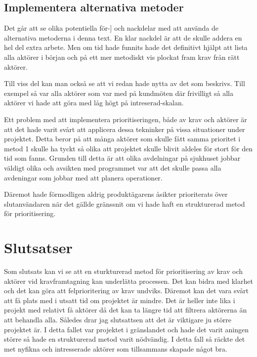 \subsection{Implementera alternativa metoder}
Det går att se olika potentiella för-] och nackdelar med att använda de alternativa metoderna i denna text. En klar nackdel är att de skulle addera en hel del extra arbete. Men om tid hade funnits hade det definitivt hjälpt att lista alla aktörer i början och på ett mer metodiskt vis plockat fram krav från rätt aktörer.

Till viss del kan man också se att vi redan hade nytta av det som beskrivs. Till exempel så var alla aktörer som var med på kundmöten där frivilligt så alla aktörer vi hade att göra med låg högt på intreserad-skalan. 

Ett problem med att implementera prioritiseringen, både av krav och aktörer är att det hade varit svårt att applicera dessa tekninker på vissa situationer under projektet. Detta beror på att många aktörer som skulle fått samma prioritet i metod 1 skulle ha tyckt så olika att projektet skulle blivit aldeles för stort för den tid som fanns. Grunden till detta är att olika avdelningar på sjukhuset jobbar väldigt olika och avsikten med programmet var att det skulle passa alla avdeningar som jobbar med att planera operationer. 

Däremot hade förmodligen aldrig produktägarens åsikter prioriterats över slutanvändaren när det gällde gränssnit om vi hade haft en strukturerad metod för prioritisering.


\section{Slutsatser}
Som slutsats kan vi se att en sturkturerad metod för prioritisering av krav och aktörer vid kravframtagning kan underlätta processen. Det kan bidra med klarhet och det kan göra att felprioritering av krav undviks. Däremot kan det vara svårt att få plats med i utsatt tid om projektet är mindre. Det är heller inte lika i projekt med relativt få aktörer då det kan ta längre tid att filtrera aktörerna än att behandla alla. Således drar jag slutsattsen att det är viktigare ju större projektet är. I detta fallet var projektet i gränslandet och hade det varit aningen större så hade en strukturerad metod varit nödvändig. I detta fall så räckte det met nyfikna och intresserade aktörer som tillsammans skapade något bra. 




